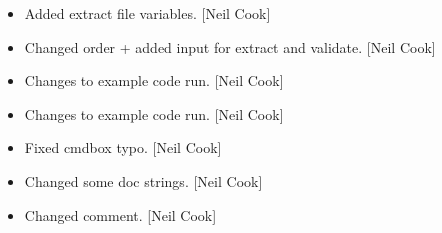\documentclass[a4paper,10pt,english]{report}
\begin{document}
\begin{itemize}
\item {} 
Added extract file variables. {[}Neil Cook{]}

\item {} 
Changed order + added input for extract and validate. {[}Neil Cook{]}

\item {} 
Changes to example code run. {[}Neil Cook{]}

\item {} 
Changes to example code run. {[}Neil Cook{]}

\item {} 
Fixed cmdbox typo. {[}Neil Cook{]}

\item {} 
Changed some doc strings. {[}Neil Cook{]}

\item {} 
Changed comment. {[}Neil Cook{]}

\end{itemize}
\end{document}
